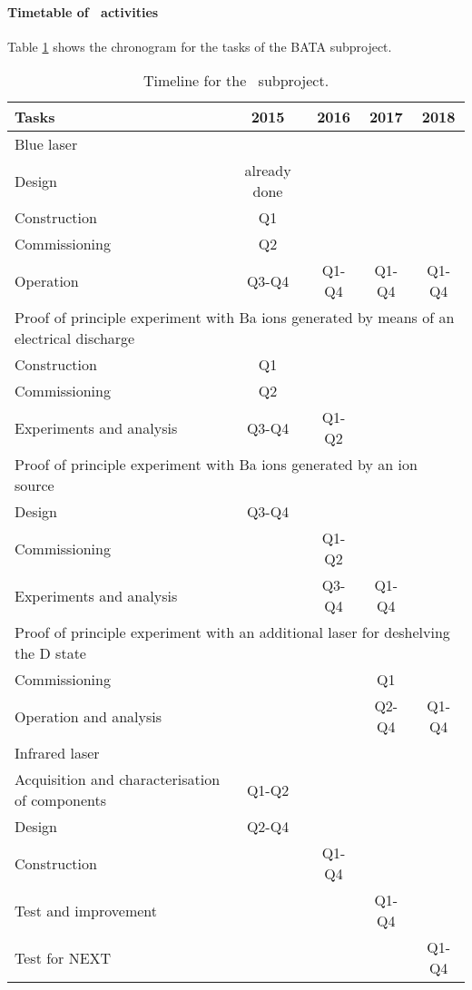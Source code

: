 \paragraph{Timetable of \BATA\ activities}
Table \ref{tab:schedule_bata} shows the chronogram for the tasks of the BATA subproject. 

\begin{table}
\begin{center}
\begin{tabular}{| l | c | c | c | c |}
\hline
Tasks & 2015 & 2016 & 2017 & 2018 \\
\hline
\multicolumn{5}{|l|}{Blue laser}  \\
\hline
Design & already done & & &  \\
Construction & Q1 & & & \\
Commissioning & Q2& & & \\
Operation &  Q3-Q4 & Q1-Q4 &  Q1-Q4&  Q1-Q4\\
\hline
\multicolumn{5}{|l|}{Proof of principle experiment with Ba ions generated by means of an electrical discharge}  \\
\hline
Construction  &  Q1 & & & \\
Commissioning &  Q2 & & & \\
Experiments and analysis &  Q3-Q4 & Q1-Q2& & \\
\hline
\multicolumn{5}{|l|}{Proof of principle experiment with Ba ions generated by an ion source}  \\
\hline
Design & Q3-Q4 & & &  \\
Commissioning  &  & Q1-Q2& & \\
Experiments and analysis &  & Q3-Q4 & Q1-Q4 & \\
\hline
\multicolumn{5}{|l|}{Proof of principle experiment with an additional laser for deshelving the D state}  \\
\hline
Commissioning  &  &  & Q1 & \\
Operation and analysis &  &  & Q2-Q4 & Q1-Q4 \\
\hline
\multicolumn{5}{|l|}{Infrared laser}  \\
\hline
Acquisition and characterisation of components  & Q1-Q2 & & &  \\
Design  & Q2-Q4  & & & \\
Construction &  & Q1-Q4 & & \\
Test and improvement &  & & Q1-Q4 & \\
Test for NEXT & & &  & Q1-Q4\\
\hline
\end{tabular}
\caption{Timeline for the \BATA\ subproject.}
\label{tab:schedule_bata}
\end{center}
\end{table}
